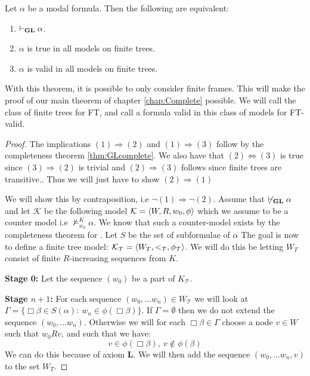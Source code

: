 \documentclass[../main.tex]{subfiles}
\begin{document}
\begin{thm}
	Let $\alpha$ be a modal formula. Then the following are equivalent:
	\begin{enumerate}
		\item $\vdash_{\text{\textbf{GL}}}\alpha$.
		\item $\alpha$ is true in all models on finite trees.
		\item $\alpha$ is valid in all models on finite trees.
	\end{enumerate}
\end{thm}
With this theorem, it is possible to only consider finite frames. This will make
the proof of our main theorem of chapter \ref{chap:Complete} possible. We will
call the class of finite trees for FT, and call a formula valid in this class
of models for FT-valid.
\begin{proof}
	The implications $(1)\Rightarrow (2)$ and $(1)\Rightarrow(3)$ follow
	by the completeness theorem \ref{thm:GLcomplete}. We also have that $(2)\Leftrightarrow (3)$
	is true since $(3)\Rightarrow(2)$ is trivial and $(2)\Rightarrow(3)$
	follows since finite trees  are transitive.. Thus we will just have to show $(2)\Rightarrow(1)$

	We will show this by contraposition, i.e $\neg(1)\Rightarrow\neg(2)$.
	Assume that $\not\vdash_{\text{\textbf{GL}}}\alpha$ and
let $\mathcal{K}$ be the following model $\mathcal{K}=\langle W,R,w_0,\phi\rangle $
which we assume to be  a counter model i.e
	$\not\vDash_{w_0}^{K}\alpha$. We know that such a counter-model
	exists by the completeness theorem for \GL. Let $S$ be the set of subformulae of
	$\alpha$ The goal is now to define a finite tree
	model: $\mathcal{K}_{\mathcal{T}}=\langle
	W_T,<_{\mathcal{T}},\phi_{\mathcal{T}}\rangle$. We will do this be
	letting $W_T$ consist of finite $R$-increasing sequences from $K$.

	\textbf{Stage 0:} Let the sequence $(w_0)$ be a part of
	$K_{\mathcal{T}}$.

	\textbf{Stage $n+1$:} For each sequence $(w_0,\ldots w_n)\in
	W_{\mathcal{T}}$ we
	will look at $\Gamma=\{\Box\beta\in S(\alpha):\
	w_n\in\phi(\Box\beta)\}$.
	If $\Gamma=\emptyset$ then we do not extend the sequence $(w_0,\ldots
	w_n)$. Otherwise we will for each $\Box\beta\in\Gamma$ choose a node
	$v\in W$ such that $w_0Rv$, and such that we have:
	\[v\in\phi(\Box\beta),\ v\not\in\phi(\beta)\]
	We can do this because of axiom \textbf{L}. We will then add the sequence
	$(w_0,\ldots w_n,v)$ to the set $W_T$.


\end{proof}
\end{document}
